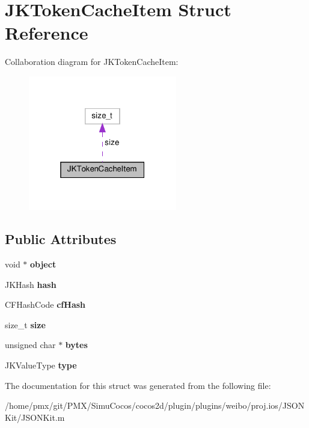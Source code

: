 \hypertarget{structJKTokenCacheItem}{}\section{J\+K\+Token\+Cache\+Item Struct Reference}
\label{structJKTokenCacheItem}


Collaboration diagram for J\+K\+Token\+Cache\+Item\+:
\nopagebreak
\begin{figure}[H]
\begin{center}
\leavevmode
\includegraphics[width=184pt]{structJKTokenCacheItem__coll__graph}
\end{center}
\end{figure}
\subsection*{Public Attributes}
\begin{DoxyCompactItemize}
\item 
\mbox{\label{structJKTokenCacheItem_a2e20066b2f883735899c4a2b5d0f485c}} 
void $\ast$ {\bfseries object}
\item 
\mbox{\label{structJKTokenCacheItem_a435cc4ad29e22676dc63f86d57505792}} 
J\+K\+Hash {\bfseries hash}
\item 
\mbox{\label{structJKTokenCacheItem_acdee4c0f0ca5d2beb2726d32188cf3cf}} 
C\+F\+Hash\+Code {\bfseries cf\+Hash}
\item 
\mbox{\label{structJKTokenCacheItem_af207b8177d67ed341eb7d76a8818f599}} 
size\+\_\+t {\bfseries size}
\item 
\mbox{\label{structJKTokenCacheItem_a8da7d44fc8a4146563cf907cb4952aea}} 
unsigned char $\ast$ {\bfseries bytes}
\item 
\mbox{\label{structJKTokenCacheItem_a3966e59525ab02ab68125e7de34b904b}} 
J\+K\+Value\+Type {\bfseries type}
\end{DoxyCompactItemize}


The documentation for this struct was generated from the following file\+:\begin{DoxyCompactItemize}
\item 
/home/pmx/git/\+P\+M\+X/\+Simu\+Cocos/cocos2d/plugin/plugins/weibo/proj.\+ios/\+J\+S\+O\+N\+Kit/J\+S\+O\+N\+Kit.\+m\end{DoxyCompactItemize}
